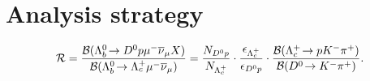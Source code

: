 \chapter{Analysis strategy}
\label{sec:Strategy}

\begin{align}
	\R =
	\frac{\BR(\decay{\Lb}{\Dz\proton \mun \neumb X})}{\BR(\decay{\Lb}{\Lc \mun\neumb})}
	 = 
	 \frac{N_{\Dz\proton}}{N_{\Lc}}  
	 \cdot \frac{\epsilon_{\Lc}}{\epsilon_{\Dz\proton}}
	 \cdot \frac{\BR(\decay{\Lc}{p \Km \pip})}{\BR(\decay{\Dz}{\Km\pip})}. \label{eq:R}
\end{align}

